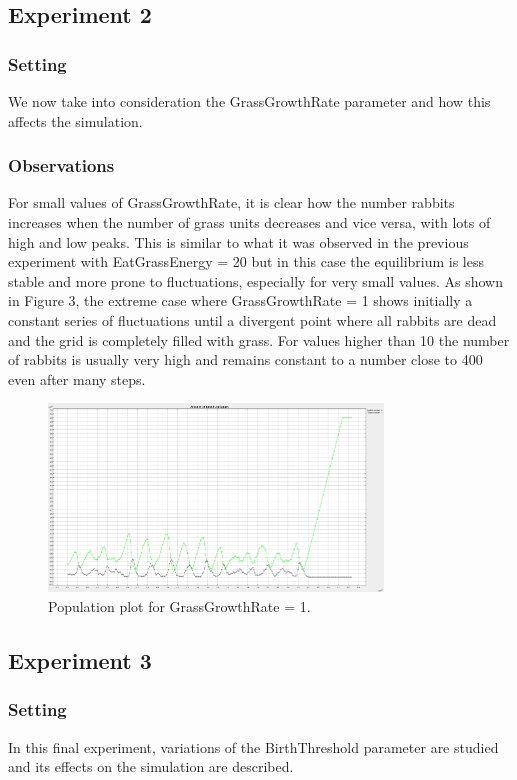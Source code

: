 \documentclass[11pt]{article}
\begin{document}
\subsection{Experiment 2}

\subsubsection{Setting}
We now take into consideration the GrassGrowthRate parameter and how this affects the simulation.

\subsubsection{Observations}
For small values of GrassGrowthRate, it is clear how the number rabbits increases when the number of grass units decreases and vice versa, with lots of high and low peaks. This is similar to what it was observed in the previous experiment with EatGrassEnergy = 20 but in this case the equilibrium is less stable and more prone to fluctuations, especially for very small values. As shown in Figure 3, the extreme case where GrassGrowthRate = 1 shows initially a constant series of fluctuations until a divergent point where all rabbits are dead and the grid is completely filled with grass. For values higher than 10 the number of rabbits is usually very high and remains constant to a number close to 400 even after many steps.   


\begin{figure}[h]
\centering
\includegraphics[width=1\linewidth, height=5cm]{setting3_3.png} 
\caption{Population plot for GrassGrowthRate = 1.}
\label{fig:image2}
\end{figure}


\subsection{Experiment 3}

\subsubsection{Setting}
In this final experiment, variations of the BirthThreshold parameter are studied and its effects on the simulation are described.
\end{document}
